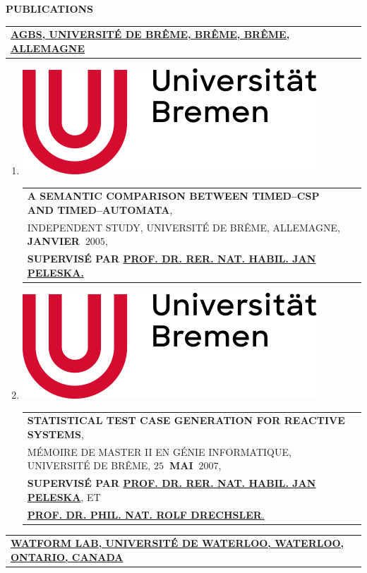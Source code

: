 \documentclass[9pt,a4paper]{article} %
\makeatletter
\newcommand{\headerrow}[2]
{\begin{tabular*}{\linewidth}{l@{\extracolsep{\fill}}r}
	#1 &
	#2 \\
\end{tabular*}}
\newcommand{\headerrowONE}[1]{\headerrow{#1}{}}
\newcommand{\yerothUNIBREMENitem}[1]
{
	\item \includegraphics[scale=0.05]{YEROTH-LOGO-UNI-BREMEN-2021.png} #1
}
\makeatother
\begin{document}
\vspace{1em}

\newpage

\begin{center}
{\large \textbf{PUBLICATIONS}}
\end{center}

\vspace{0.5em}


\headerrowONE{\href{http://www.informatik.uni-bremen.de/agbs}{
	\textbf{AGBS, UNIVERSITÉ DE BRÊME, BRÊME, BRÊME, ALLEMAGNE}}}

\vspace{0.3em}

\begin{enumerate}
	\yerothUNIBREMENitem
		\headerrowONE{\textbf{A SEMANTIC COMPARISON BETWEEN TIMED--CSP AND TIMED--AUTOMATA},\\
	INDEPENDENT STUDY, UNIVERSITÉ DE BRÊME, ALLEMAGNE, \textbf{JANVIER~$2005$},\\
	\textbf{SUPERVISÉ PAR \href{http://www.informatik.uni-bremen.de/agbs/jp}
		{PROF. DR. RER. NAT. HABIL. JAN PELESKA.}}}
 
	\yerothUNIBREMENitem
		 \headerrowONE{\textbf{STATISTICAL TEST CASE GENERATION FOR REACTIVE SYSTEMS},\\
	MÉMOIRE DE MASTER II EN GÉNIE INFORMATIQUE, UNIVERSITÉ DE BRÊME, \textbf{$25$~MAI~$2007$},\\
	\textbf{SUPERVISÉ PAR \href{http://www.informatik.uni-bremen.de/agbs/jp}{
	PROF. DR. RER. NAT. HABIL. JAN PELESKA}}, ET\\
	\href{http://www.rolfdrechsler.de}{\textbf{PROF. DR. PHIL. NAT. ROLF DRECHSLER}.}}
\end{enumerate}


\vspace{1em}


\headerrowONE{\href{http://watform.uwaterloo.ca}{
	\textbf{WATFORM LAB, UNIVERSITÉ DE WATERLOO, WATERLOO, ONTARIO, CANADA}}}

\vspace{0.3em}
\end{document}
